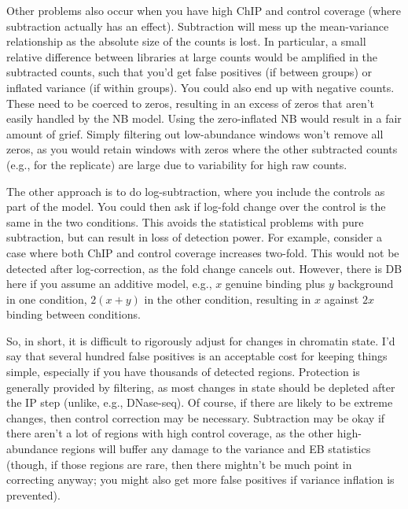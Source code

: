 \documentclass[12pt]{report}
\begin{document}
Other problems also occur when you have high ChIP and control coverage (where subtraction actually has an effect). 
Subtraction will mess up the mean-variance relationship as the absolute size of the counts is lost.
In particular, a small relative difference between libraries at large counts would be amplified in the subtracted counts, such that you'd get false positives (if between groups) or inflated variance (if within groups). 
You could also end up with negative counts. 
These need to be coerced to zeros, resulting in an excess of zeros that aren't easily handled by the NB model.
Using the zero-inflated NB would result in a fair amount of grief.
Simply filtering out low-abundance windows won't remove all zeros, as you would retain windows with zeros where the other subtracted counts (e.g., for the replicate) are large due to variability for high raw counts.

The other approach is to do log-subtraction, where you include the controls as part of the model.
You could then ask if log-fold change over the control is the same in the two conditions.
This avoids the statistical problems with pure subtraction, but can result in loss of detection power.
For example, consider a case where both ChIP and control coverage increases two-fold. 
This would not be detected after log-correction, as the fold change cancels out.
However, there is DB here if you assume an additive model, e.g., $x$ genuine binding plus $y$ background in one condition, $2(x+y)$ in the other condition, resulting in $x$ against $2x$ binding between conditions.

 
So, in short, it is difficult to rigorously adjust for changes in chromatin state.
I'd say that several hundred false positives is an acceptable cost for keeping things simple, especially if you have thousands of detected regions.
Protection is generally provided by filtering, as most changes in state should be depleted after the IP step (unlike, e.g., DNase-seq).
Of course, if there are likely to be extreme changes, then control correction may be necessary. 
Subtraction may be okay if there aren't a lot of regions with high control coverage, as the other high-abundance regions will buffer any damage to the variance and EB statistics (though, if those regions are rare, then there mightn't be much point in correcting anyway; you might also get more false positives if variance inflation is prevented).
\end{document}
